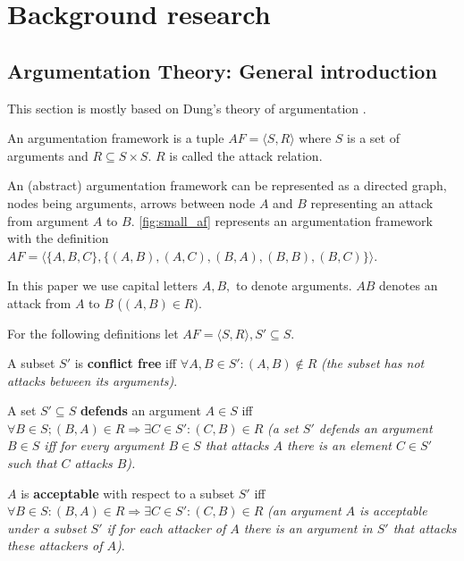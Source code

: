 \section{Background research} 

\subsection{Argumentation Theory: General introduction}
This section is mostly based on Dung's theory of argumentation \cite{Dung1995321}. 

\begin{definition}
	An argumentation framework is a tuple $AF = \langle S, R \rangle$ where $S$ is a set of arguments and $ R \subseteq S \times S$. $R$ is called the attack relation.
\end{definition}

An (abstract) argumentation framework can be represented as a directed graph, nodes being arguments, arrows between node $A$ and $B$ representing an attack from argument $A$ to $B$. \autoref{fig:small_af} represents an argumentation framework with the definition $AF = \langle \{A, B, C\}, \{(A,B), (A, C), (B, A), (B, B), (B, C) \}\rangle$.

\begin{notation}
In this paper we use capital letters $A, B, $ to denote arguments. $AB$ denotes an attack from $A$ to $B$ ($(A,B) \in R$).	
\end{notation}

For the following definitions let $AF=\langle S, R \rangle, S' \subseteq S$.

\begin{definition}
 A subset $S'$ is \textbf{conflict free} iff $ \forall A, B \in S': (A, B) \notin R$ \textit{(the subset has not attacks between its arguments)}.
\end{definition}

\begin{definition}
A set $ S' \subseteq S$ \textbf{defends} an argument $A \in S$ iff $\forall B \in S; (B, A) \in R \Rightarrow \exists C \in S': (C, B) \in R$ \textit{(a set $S'$ defends an argument $B \in S$ iff for every argument $B \in S$ that attacks $A$ there is an element $C \in S'$ such that $C$ attacks $B$).}
\end{definition}


\begin{definition}
$A$ is \textbf{acceptable} with respect to a subset $S'$ iff  $\forall B \in S: (B, A) \in R \Rightarrow \exists C \in S': (C, B) \in R$ \textit{(an argument $A$ is acceptable under a subset $S'$ if for each attacker of $A$ there is an argument in $S'$ that attacks these attackers of $A$)}.
\end{definition}

